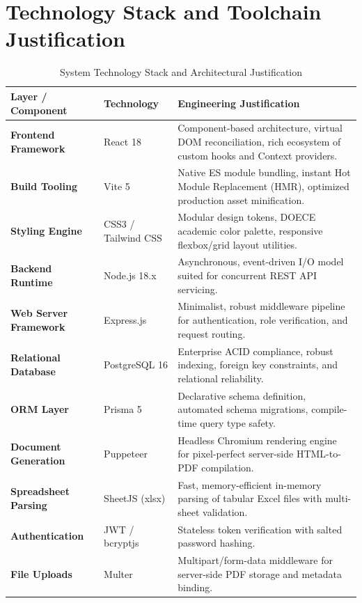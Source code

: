 \section{Technology Stack and Toolchain Justification}

\begin{table}[H]
\centering
\small
\caption{System Technology Stack and Architectural Justification}
\label{tab:tech_stack}
\vspace{6pt}
\begin{tabularx}{\textwidth}{|l|l|X|}
\hline
\textbf{Layer / Component} & \textbf{Technology} & \textbf{Engineering Justification} \\
\hline
\textbf{Frontend Framework} & React 18 & Component-based architecture, virtual DOM reconciliation, rich ecosystem of custom hooks and Context providers. \\
\hline
\textbf{Build Tooling} & Vite 5 & Native ES module bundling, instant Hot Module Replacement (HMR), optimized production asset minification. \\
\hline
\textbf{Styling Engine} & CSS3 / Tailwind CSS & Modular design tokens, DOECE academic color palette, responsive flexbox/grid layout utilities. \\
\hline
\textbf{Backend Runtime} & Node.js 18.x & Asynchronous, event-driven I/O model suited for concurrent REST API servicing. \\
\hline
\textbf{Web Server Framework} & Express.js & Minimalist, robust middleware pipeline for authentication, role verification, and request routing. \\
\hline
\textbf{Relational Database} & PostgreSQL 16 & Enterprise ACID compliance, robust indexing, foreign key constraints, and relational reliability. \\
\hline
\textbf{ORM Layer} & Prisma 5 & Declarative schema definition, automated schema migrations, compile-time query type safety. \\
\hline
\textbf{Document Generation} & Puppeteer & Headless Chromium rendering engine for pixel-perfect server-side HTML-to-PDF compilation. \\
\hline
\textbf{Spreadsheet Parsing} & SheetJS (xlsx) & Fast, memory-efficient in-memory parsing of tabular Excel files with multi-sheet validation. \\
\hline
\textbf{Authentication} & JWT / bcryptjs & Stateless token verification with salted password hashing. \\
\hline
\textbf{File Uploads} & Multer & Multipart/form-data middleware for server-side PDF storage and metadata binding. \\
\hline
\end{tabularx}
\end{table}
